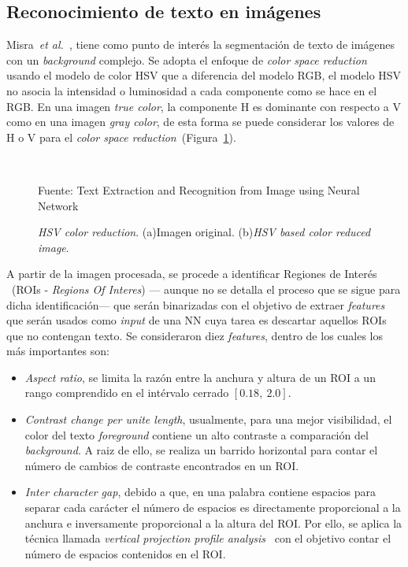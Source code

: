 \subsection{Reconocimiento de texto en imágenes}

Misra~\textit{et al.}~\cite{Misra:2012:TEandR}, tiene como punto de interés la
segmentación de texto de imágenes con un \textit{background} complejo. Se adopta
el enfoque de \textit{color space reduction} usando el modelo de color HSV que a
diferencia del modelo RGB, el modelo HSV no asocia la intensidad o luminosidad a
cada componente como se hace en el RGB. En una imagen \textit{true color}, la
componente H es dominante con respecto a V como en una imagen \textit{gray
color}, de esta forma se puede considerar los valores de H o V para el
\textit{color space
reduction}~(Figura~\ref{Fig:cap-reconocimiento:HSV-colorreduction}).

\begin{figure}[h!]
	\centering
	 { }
	 \\  
	\caption[\textit{HSV color reduction}]{\textit{HSV color reduction}. (a)Imagen
original. (b)\textit{HSV based color reduced image}.}\tiny{Fuente: Text
Extraction and Recognition from Image using Neural Network
	\cite{Misra:2012:TEandR}}
	\label{Fig:cap-reconocimiento:HSV-colorreduction}
\end{figure}

A partir de la imagen procesada, se procede a identificar Regiones de Interés
~(ROIs - \textit{Regions Of Interes}) --- aunque no se detalla el proceso que se
sigue para dicha identificación--- que serán binarizadas con el objetivo de
extraer \textit{features} que serán usados como \textit{input} de una NN cuya
tarea es descartar aquellos ROIs que no contengan texto. Se consideraron diez
\textit{features}, dentro de los cuales los más importantes son:
\begin{itemize}
	\item \textit{Aspect ratio}, se limita la razón entre la anchura y altura de
un ROI a un rango comprendido en el intérvalo cerrado $[0.18, ~2.0]$.
	\item \textit{Contrast change per unite length}, usualmente, para una mejor
visibilidad, el color del texto \textit{foreground} contiene un alto contraste a
comparación del \textit{background}. A raiz de ello, se realiza un barrido
horizontal para contar el número de cambios de contraste encontrados en un ROI.
	\item \textit{Inter character gap}, debido a que, en una palabra contiene
espacios para separar cada carácter el número de espacios es directamente
proporcional a la anchura e inversamente proporcional a la altura del ROI. Por
ello, se aplica la técnica llamada \textit{vertical projection profile
analysis}~\cite{DIP:2008:RinBI} con el objetivo contar el número de espacios
contenidos en el ROI.
\end{itemize}

